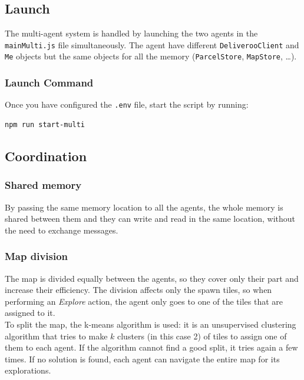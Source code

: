 \subsection{Launch}
The multi-agent system is handled by launching the two agents in the \texttt{mainMulti.js} file simultaneously. The agent have different \texttt{DeliverooClient} and \texttt{Me} objects but the same objects for all the memory (\texttt{ParcelStore}, \texttt{MapStore}, \dots).

\subsubsection*{Launch Command}
Once you have configured the \texttt{.env} file, start the script by running:
\begin{verbatim}
npm run start-multi
\end{verbatim}




\subsection{Coordination}
\subsubsection*{Shared memory}
By passing the same memory location to all the agents, the whole memory is shared between them and they can write and read in the same location, without the need to exchange messages.

\subsubsection*{Map division}
The map is divided equally between the agents, so they cover only their part and increase their efficiency. The division affects only the spawn tiles, so when performing an \textit{Explore} action, the agent only goes to one of the tiles that are assigned to it. \\

\noindent To split the map, the k-means algorithm is used: it is an unsupervised clustering algorithm that tries to make $k$ clusters (in this case 2) of tiles to assign one of them to each agent. If the algorithm cannot find a good split, it tries again a few times. If no solution is found, each agent can navigate the entire map for its explorations. 

